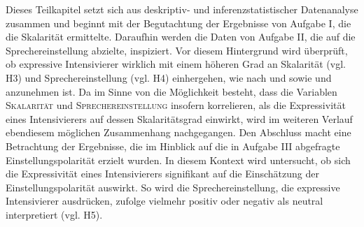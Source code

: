 Dieses Teilkapitel setzt sich aus deskriptiv- und inferenzstatistischer Datenanalyse zusammen und beginnt mit der Begutachtung der Ergebnisse von {Aufgabe I}, die die Skalarität ermittelte. Daraufhin werden die Daten von {Aufgabe II}, die auf die Sprechereinstellung abzielte, inspiziert. Vor diesem Hintergrund wird überprüft, ob expressive Intensivierer wirklich mit einem höheren Grad an Skalarität (vgl. H3) und Sprechereinstellung {(vgl. H4)} einhergehen, wie nach \citet[22]{Paradis.1997} und \citet[133]{Gutzmann.2019a} sowie {\citet[315]{Lang.1983}} und \citet[57]{Ortner.2014} anzunehmen ist. Da im Sinne von {\citet[133]{Gutzmann.2019a}} die Möglichkeit besteht, dass die Variablen \textsc{Skalarität} und \textsc{Sprechereinstellung} insofern korrelieren, als die Expressivität eines Intensivierers auf dessen Skalaritätsgrad einwirkt, wird im weiteren Verlauf ebendiesem möglichen Zusammenhang nachgegangen. Den Abschluss macht eine Betrachtung der Ergebnisse, die im Hinblick auf die in {Aufgabe III} abgefragte Einstellungspolarität erzielt wurden. In diesem Kontext wird untersucht, ob sich die Expressivität eines Intensivierers signifikant auf die Einschätzung der Einstellungspolarität auswirkt. So wird die Sprechereinstellung, die expressive Intensivierer ausdrücken, {\citet[135]{Gutzmann.2019a}} zufolge vielmehr positiv oder negativ als neutral interpretiert (vgl. H5).



